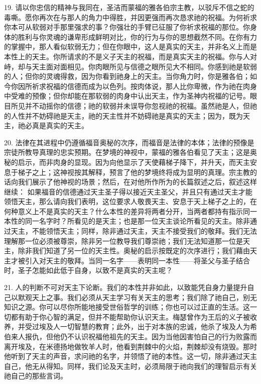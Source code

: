 19. 请以你忠信的精神与我同在，圣洁而蒙福的雅各伯宗主教，以驳斥不信之蛇的毒嘶。愿你再次在与那人的角力中得胜，并因更强而再次恳求祂的祝福。为何祈求你本可从软弱对手那里强求的事？你强壮的手臂已征服了你祈求祝福的那位。你身体的胜利与你灵魂的谦卑形成鲜明对比，你的行为与你的思想截然不同。在你有力的掌握中，那人看似软弱无力；但在你眼中，这人是真实的天主，并非名义上而是本性上的天主。你所请求的不是义子天主的祝福，而是真实天主的祝福。你与人对峙，却与天主面对面相见。你肉眼所见与信德之眼所见大不相同。你感到祂是软弱的人；但你的灵魂得救，因为你看到祂身上的天主。当你角力时，你是雅各伯；如今你因所祈求祝福的信德而成为以色列。按肉体说，那人比你卑微，作为祂在肉身中受难的预像；但你却能在那软弱的肉身中认出天主，作为圣神内祝福的记号。眼目所见并不动摇你的信德；祂的软弱并未误导你忽视祂的祝福。虽然祂是人，但祂的人性并不妨碍祂是天主，祂的天主性并不妨碍祂是真实的天主；因为，既为天主，祂必真是真实的天主。\par

20. 法律在其进程中仍遵循福音奥秘的次序，而福音是法律的本体；法律的预像是宗徒所教导真理的忠实预期。在梦境的神视中，蒙福的雅各伯看见了天主；这是奥秘的启示，而非肉身的显现。因为向他显示了天使藉梯子降下，并升天，而天主安息于梯子之上；这神视按其解释，预言了他的梦境终将成为显明的真理。宗主教的话向我们展示了他神视的场景；然后，在对他所作所为的长篇叙述之后，叙述这样继续： 如果福音的信德通过天主圣子得以接近天主圣父，并且只有通过天主才能领悟天主，那么请向我们表明，这位要求人敬畏天主、安息于天上梯子之上的，在何种意义上不是真实的天主？什么本性的差异将两者分开，当两者都持有指示同一本性的同一名字时？所看见的是天主；也是那一位天主谈论所看见的天主。除非通过天主，不能领悟天主；同样，除非通过天主，天主不接受我们的敬拜。我们无法理解那一位必须被尊崇，除非另一位教导我们尊崇祂；我们无法知道那一位是天主，除非我们知道了另一位的天主性。奥秘的启示按既定的次序进行；我们藉由天主才被引入对天主的敬拜。当同一名字——表明同一本性——将圣父与圣子结合时，圣子怎能如此低于自身，以致不是真实的天主呢？\par

21. 人的判断不可对天主下论断。我们的本性并非如此，以致能凭自身力量提升自己以默观天上之事。我们必须从天主学习有关天主的思考；我们除了祂自己，别无知识之源。你可以尽你所能地接受世俗哲学的训练；你也可以过正直的生活。这一切都有助于你心智的满足，但并不能帮助你认识天主。梅瑟曾作为王后的义子被收养，并受过埃及人一切智慧的教育；此外，出于对本族的忠诚，他杀了埃及人为希伯来人报仇，但他仍不认识祝福他祖先的天主。因为当他因害怕自己的行为败露而离开埃及，在米德扬地做牧羊人时，他看到荆棘中的火焰，荆棘却没有烧毁。那时他听到了天主的声音，求问祂的名字，并领悟了祂的本性。这一切，除非通过天主自己，他无从得知。同样，我们论及天主时，必须局限于祂向我们的理智启示有关祂自己的那些言词。\par

